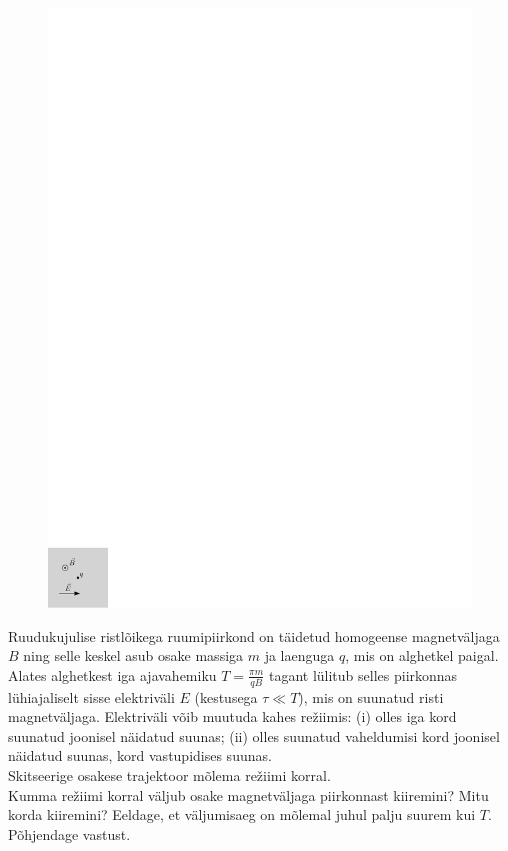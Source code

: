 \documentclass[10pt, twoside]{article}
\begin{document}
{
\begin{figure}
	\vspace{-2.5ex}
	\includegraphics[width=\linewidth]{2010-lahg-08-laengu_joonis_ipe}
	\vspace{-6ex}
\end{figure}
Ruudukujulise ristlõikega ruumipiirkond on täidetud homogeense magnetväljaga
$B$ ning selle keskel asub osake massiga $m$ ja laenguga $q$, mis on alghetkel
paigal. Alates alghetkest iga ajavahemiku $T=\frac{\pi m}{qB}$ tagant lülitub
selles piirkonnas lühiajaliselt sisse elektriväli $E$ (kestusega $\tau \ll T$), mis
on suunatud risti magnetväljaga. Elektriväli võib muutuda kahes
režiimis: (i) olles iga kord suunatud joonisel näidatud suunas; (ii)
olles suunatud vaheldumisi kord joonisel näidatud suunas, kord vastupidises
suunas.\\
\osa Skitseerige osakese trajektoor mõlema režiimi korral.\\
\osa Kumma
režiimi korral väljub osake magnetväljaga piirkonnast kiiremini? Mitu korda
kiiremini?
Eeldage, et väljumisaeg on mõlemal juhul palju suurem kui $T$. Põhjendage vastust.
\probend
\bigskip

}
\end{document}
